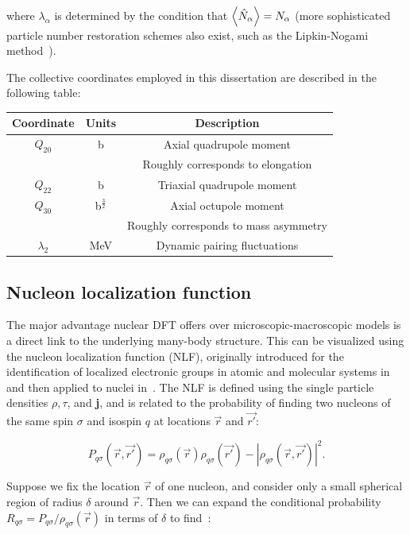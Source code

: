 \noindent where $\lambda_\alpha$ is determined by the condition that $\expval{\hat{N}_\alpha} = N_\alpha$ (more sophisticated particle number restoration schemes also exist, such as the Lipkin-Nogami method~\cite{Stoitsov2007, Lipkin1960, Nogami1964, Pradhan1973, Flocard1997}). %

The collective coordinates employed in this dissertation are described in the following table:


\begin{tabular}{|ccc|}
	\hline \textbf{Coordinate} & \textbf{Units} & \textbf{Description} \\ \hline
	$Q_{20}$ & b & Axial quadrupole moment \\
	& & Roughly corresponds to elongation \\
	$Q_{22}$ & b & Triaxial quadrupole moment \\
	$Q_{30}$ & b$^\frac{3}{2}$ & Axial octupole moment \\
	& & Roughly corresponds to mass asymmetry \\
	$\lambda_{2}$ & MeV & Dynamic pairing fluctuations \\ \hline
\end{tabular} 

\subsection{Nucleon localization function}\label{sect:locali}
The major advantage nuclear DFT offers over microscopic-macroscopic models is a direct link to the underlying many-body structure. This can be visualized using the nucleon localization function (NLF), originally introduced for the identification of localized electronic groups in atomic and molecular systems in~\cite{Becke1990} and then applied to nuclei in~\cite{Reinhard2011,Zhang2016}. The NLF is defined using the single particle densities $\rho, \tau$, and \textbf{j}, and is related to the probability of finding two nucleons of the same spin $\sigma$ and isospin $q$ at locations $\vec{r}$ and $\vec{r'}$:

\begin{equation}
	P_{q\sigma}(\vec{r},\vec{r'}) = \rho_{q\sigma}(\vec{r})\rho_{q\sigma}(\vec{r'}) - \left|\rho_{q\sigma}(\vec{r},\vec{r'})\right|^2.
\end{equation}

Suppose we fix the location $\vec{r}$ of one nucleon, and consider only a small spherical region of radius $\delta$ around $\vec{r}$. Then we can expand the conditional probability $R_{q\sigma} = P_{q\sigma}/\rho_{q\sigma}(\vec{r})$ in terms of $\delta$ to find~\cite{Becke1990}:

